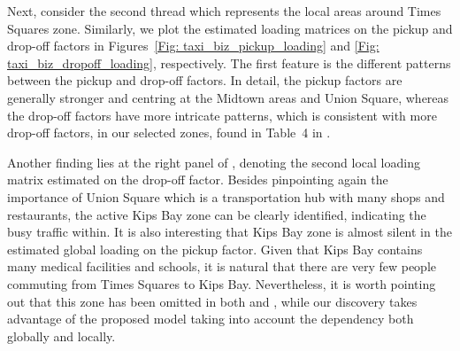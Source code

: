 \documentclass[aos]{imsart}
\theoremstyle{plain}
\theoremstyle{definition}
\begin{document}
Next, consider the second thread which represents the local areas around Times Squares zone. Similarly, we plot the estimated loading matrices on the pickup and drop-off factors in Figures~\ref{Fig: taxi_biz_pickup_loading} and \ref{Fig: taxi_biz_dropoff_loading}, respectively. The first feature is the different patterns between the pickup and drop-off factors. In detail, the pickup factors are generally stronger and centring at the Midtown areas and Union Square, whereas the drop-off factors have more intricate patterns, which is consistent with more drop-off factors, in our selected zones, found in Table~4 in \cite{Chenetal2022}.

Another finding lies at the right panel of , denoting the second local loading matrix estimated on the drop-off factor. Besides pinpointing again the importance of Union Square which is a transportation hub with many shops and restaurants, the active Kips Bay zone can be clearly identified, indicating the busy traffic within. It is also interesting that Kips Bay zone is almost silent in the estimated global loading on the pickup factor. Given that Kips Bay contains many medical facilities and schools, it is natural that there are very few people commuting from Times Squares to Kips Bay. Nevertheless, it is worth pointing out that this zone has been omitted in both \cite{Chenetal2022} and \cite{CenLam2025}, while our discovery takes advantage of the proposed model taking into account the dependency both globally and locally.












\end{document}

